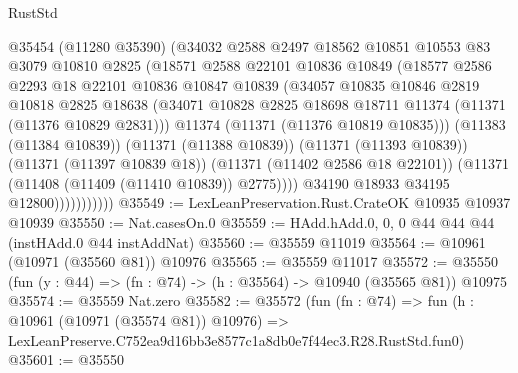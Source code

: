 \begin{lexlean}{RustStd}
\begin{coremodule}
                        @35454
                        (@11280 @35390)
                        (@34032
                          @2588
                          @2497
                          @18562
                          @10851
                          @10553
                          @83
                          @3079
                          @10810
                          @2825
                          (@18571
                            @2588
                            @22101
                            @10836
                            @10849
                            (@18577
                              @2586
                              @2293
                              @18
                              @22101
                              @10836
                              @10847
                              @10839
                              (@34057
                                @10835
                                @10846
                                @2819
                                @10818
                                @2825
                                @18638
                                (@34071
                                  @10828
                                  @2825
                                  @18698
                                  @18711
                                  @11374
                                  (@11371 (@11376 @10829 @2831)))
                                @11374
                                (@11371 (@11376 @10819 @10835)))
                              (@11383 (@11384 @10839))
                              (@11371 (@11388 @10839))
                              (@11371 (@11393 @10839))
                              (@11371 (@11397 @10839 @18))
                              (@11371 (@11402 @2586 @18 @22101))
                              (@11371 (@11408 (@11409 (@11410 @10839)) @2775))))
                          @34190
                          @18933
                          @34195
                          @12800)))))))))))
@35549 := LexLeanPreservation.Rust.CrateOK @10935 @10937 @10939
@35550 := Nat.casesOn.{0}
@35559 := HAdd.hAdd.{0, 0, 0} @44 @44 @44 (instHAdd.{0} @44 instAddNat)
@35560 := @35559 @11019
@35564 := @10961 (@10971 (@35560 @81)) @10976
@35565 := @35559 @11017
@35572 := @35550 (fun (y : @44) => (fn : @74) -> (h : @35564) -> @10940 (@35565 @81)) @10975
@35574 := @35559 Nat.zero
@35582 := @35572
    (fun (fn : @74) =>
    fun (h : @10961 (@10971 (@35574 @81)) @10976) =>
    LexLeanPreserve.C752ea9d16bb3e8577c1a8db0e7f44ec3.R28.RustStd.fun0)
@35601 := @35550

\end{coremodule}
\end{lexlean}

